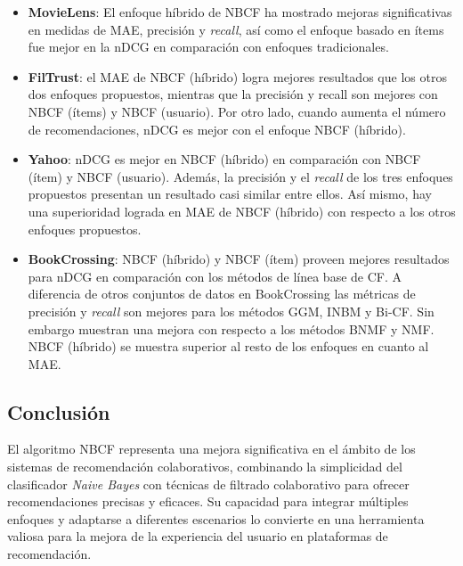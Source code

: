 \documentclass[runningheads,a4paper]{llncs}
\begin{document}
\begin{itemize}
    \item \textbf{MovieLens}: El enfoque 
    híbrido de NBCF ha mostrado mejoras significativas en 
    medidas de MAE, precisión y \textit{recall}, 
    así como el enfoque basado en ítems fue mejor en la 
    nDCG en comparación con enfoques 
    tradicionales.\cite{tesis_sistema_recomendador_hibrido}
    \item \textbf{FilTrust}: el MAE de NBCF (híbrido) 
    logra mejores resultados que los otros dos enfoques 
    propuestos, mientras que la precisión y recall son 
    mejores con NBCF (ítems) y NBCF (usuario). 
    Por otro lado, cuando aumenta el número de 
    recomendaciones, nDCG es mejor con el enfoque NBCF (híbrido).\cite{tesis_sistema_recomendador_hibrido}
    \item \textbf{Yahoo}: nDCG es mejor en NBCF
    (híbrido) en comparación con NBCF (ítem) y NBCF (usuario). 
    Además, la precisión y el \textit{recall} de los 
    tres enfoques propuestos presentan un resultado 
    casi similar entre ellos. Así mismo, hay una 
    superioridad lograda en MAE de NBCF (híbrido)
    con respecto a los otros enfoques propuestos.\cite{tesis_sistema_recomendador_hibrido}
    \item \textbf{BookCrossing}: NBCF (híbrido) y NBCF (ítem)
    proveen mejores resultados para nDCG en 
    comparación con los métodos de línea base de CF. 
    A diferencia de otros conjuntos de datos en 
    BookCrossing las métricas de precisión y \textit{recall} 
    son mejores para los métodos GGM, INBM y Bi-CF. 
    Sin embargo muestran una mejora con respecto a 
    los métodos BNMF y NMF. NBCF (híbrido) se muestra 
    superior al resto de los enfoques en cuanto al MAE.\cite{tesis_sistema_recomendador_hibrido}
\end{itemize}

\subsection{Conclusión}

El algoritmo NBCF representa una mejora significativa 
en el ámbito de los sistemas de recomendación 
colaborativos, combinando la simplicidad del 
clasificador \textit{Naive Bayes} con técnicas de filtrado 
colaborativo para ofrecer recomendaciones precisas y 
eficaces. Su capacidad para integrar múltiples 
enfoques y adaptarse a diferentes escenarios lo 
convierte en una herramienta valiosa para la mejora de 
la experiencia del usuario en plataformas de 
recomendación.
\end{document}
